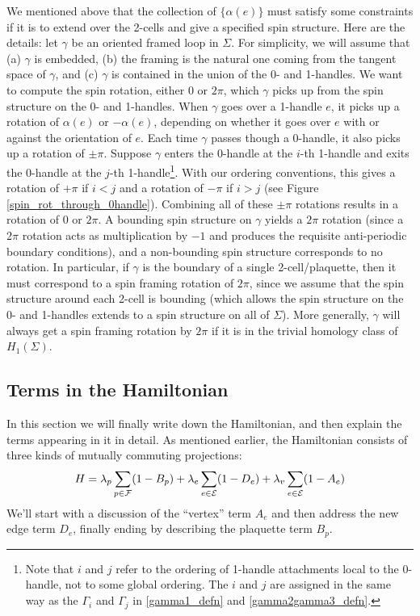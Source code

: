 We mentioned above that the collection of $\{\alpha(e)\}$ must satisfy some constraints if it is 
to extend over the 2-cells and give a specified spin structure.
Here are the details:
let $\gamma$ be an oriented framed loop in $\Sigma$.
For simplicity, we will assume that (a) $\gamma$ is embedded, (b) the framing is the natural one coming from the tangent 
space of $\gamma$, and (c) $\gamma$ is contained in the union of the 0- and 1-handles.
We want to compute the spin rotation, either 0 or $2\pi$, which $\gamma$ picks up from the spin structure on the 0- and 1-handles.
When $\gamma$ goes over a 1-handle $e$, it picks up a rotation of $\alpha(e)$ or $-\alpha(e)$, depending on whether it goes over $e$
with or against the orientation of $e$.
Each time $\gamma$ passes though a 0-handle, it also picks up a rotation of $\pm\pi$.
Suppose $\gamma$ enters the 0-handle at the $i$-th 1-handle and exits the 0-handle at the $j$-th 1-handle\footnote{Note that $i$ and $j$ refer to the ordering of 1-handle attachments local to the 0-handle, not to some global ordering. The $i$ and $j$ are assigned in the same way as the $\Gamma_i$ and $\Gamma_j$ in \eqref{gamma1_defn} and \eqref{gamma2gamma3_defn}.}.
With our ordering conventions, this gives a rotation of $+\pi$ if $i<j$ and a rotation of $-\pi$ if $i > j$ (see Figure \ref{spin_rot_through_0handle}).
Combining all of these $\pm\pi$ rotations results in a rotation of 0 or $2\pi$.
A bounding spin structure on $\gamma$ yields a $2\pi$ rotation (since a $2\pi$ rotation acts as 
multiplication by $-1$ and produces the requisite anti-periodic boundary conditions), and a non-bounding 
spin structure corresponds to no rotation.
In particular, if $\gamma$ is the boundary of a single 2-cell/plaquette, then it must correspond to a spin 
framing rotation of $2\pi$, since we assume that the spin structure around each 2-cell is bounding (which 
allows the spin structure on the 0- and 1-handles extends to a spin structure on all of $\Sigma$). 
More generally, $\gamma$ will always get a spin framing rotation by $2\pi$ if it is in the trivial homology 
class of $H_1(\Sigma)$.



\subsection{Terms in the Hamiltonian} \label{terms_in_Hamiltonian}

In this section we will finally write down the Hamiltonian, and then explain the terms appearing in it in detail. 
As mentioned earlier, the Hamiltonian consists of three kinds of mutually commuting projections:
\begin{align} \label{terms_in_ham}
H = \lambda_p \sum_{p \in \mathcal{F}} (1-B_p)  + \lambda_e \sum_{e \in \mathcal{E}} (1-D_e) + \lambda_v \sum_{e\in \mathcal{E}} (1-A_e)
\end{align}
We'll start with a discussion of the ``vertex'' term $A_e$ and then address the new edge term $D_e$, 
finally ending by describing the plaquette term $B_p$.




